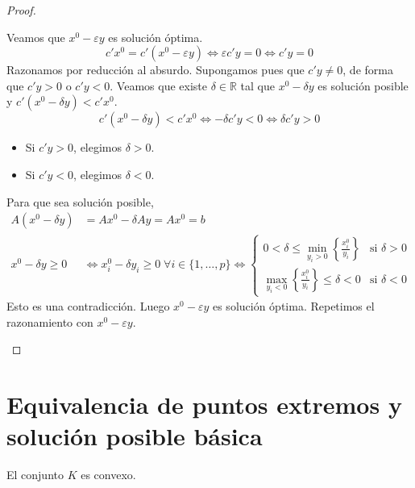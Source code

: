 \begin{proof}
\begin{enumerate}
\begin{enumerate}
                        Veamos que $x^0 - \varepsilon y$ es solución óptima.
                        $$c'x^0 = c'(x^0 - \varepsilon y) \Leftrightarrow \varepsilon c'y = 0 \Leftrightarrow c'y = 0$$
                        Razonamos por reducción al absurdo.
                        Supongamos pues que $c'y \neq 0$, de forma que $c'y > 0$ o $c'y < 0$.
                        Veamos que existe $\delta \in \mathbb{R}$ tal que $x^0 - \delta y$ es solución posible y $c'(x^0 - \delta y) < c'x^0$.
                        $$c'(x^0 - \delta y) < c'x^0 \Leftrightarrow -\delta c'y < 0 \Leftrightarrow \delta c'y > 0$$
                        \begin{itemize}
                            \item Si $c'y > 0$, elegimos $\delta > 0$.
                            \item Si $c'y < 0$, elegimos $\delta < 0$.
                        \end{itemize}
                        Para que sea solución posible,
                        \begin{align*}
                            A(x^0 - \delta y)     & = Ax^0 - \delta Ay = Ax^0 = b                                                                           \\
                            x^0 - \delta y \geq 0 & \Leftrightarrow x^0_i - \delta y_i \geq 0 \; \forall i \in \{1, \dots, p\} \Leftrightarrow \begin{cases}
                                                                        0 < \delta \leq \min_{y_i > 0} \left\{\frac{x^0_i}{y_i}\right\} & \text{si } \delta > 0 \\
                                                                        \max_{y_i < 0} \left\{\frac{x^0_i}{y_i}\right\} \leq \delta < 0 & \text{si } \delta < 0
                                                                    \end{cases}
                        \end{align*}
                        Esto es una contradicción.
                        Luego $x^0 - \varepsilon y$ es solución óptima.
                        Repetimos el razonamiento con $x^0 - \varepsilon y$.
              \end{enumerate}
    \end{enumerate}
\end{proof}

\section{Equivalencia de puntos extremos y solución posible básica}
\begin{theorem}
    El conjunto $K$ es convexo.
\end{theorem}

